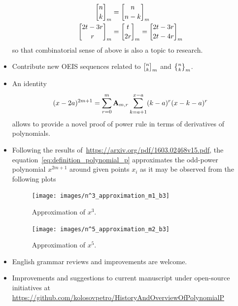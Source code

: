 \begin{itemize}
\begin{align*}
        {n \brack k}_{m} &= {n \brack n-k}_{m} \\
        {2t-3r \brack r}_{m} &= {t \brack 2r}_{m} = {2t-3r \brack 2t-4r}_{m}
    \end{align*}
    so that combinatorial sense of above is also a topic to research.
    \item Contribute new OEIS sequences related to ${n \brack k}_{m}$ and ${n \brace k}_{m}$.
    \item An identity
    \begin{align*}
    (x-2a)
        ^{2m+1} = \sum_{r=0}^{m} {\mathbf{A}} \sb{m,r} \sum_{k=a+1}^{x-a} (k-a)^r (x-k-a)^r
    \end{align*}
    allows to provide a novel proof of power rule in terms of derivatives of polynomials.
    \item Following the results of~\url{https://arxiv.org/pdf/1603.02468v15.pdf},
    the equation~\eqref{eq:definition_polynomial_p} approximates the odd-power polynomial $x^{2m+1}$ around given points
    $x_i$ as it may be observed from the following plots
    \begin{figure}[H]
        \centering
        \texttt{[image: images/n^3\_approximation\_m1\_b3]}
        ~\caption{Approximation of $x^3$.}\label{fig:approximation-n3}
    \end{figure}
    \begin{figure}[H]
        \centering
        \texttt{[image: images/n^5\_approximation\_m2\_b3]}
        ~\caption{Approximation of $x^5$.}\label{fig:approximation-n5}
    \end{figure}
    \item English grammar reviews and improvements are welcome.
    \item Improvements and suggestions to current manuscript under open-source initiatives at
    \url{https://github.com/kolosovpetro/HistoryAndOverviewOfPolynomialP}
\end{itemize}
